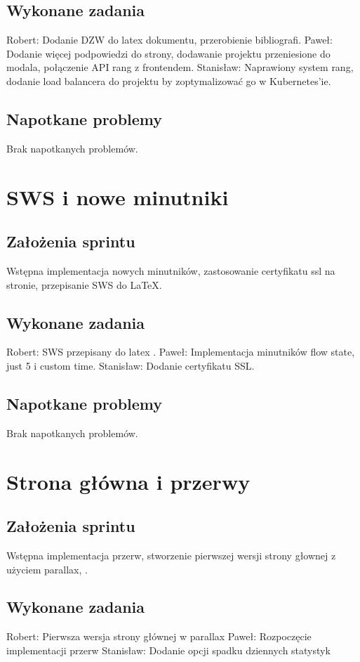 \documentclass[a4paper,11pt]{report}
\begin{document}
\subsection {Wykonane zadania}
Robert: Dodanie DZW do latex dokumentu, przerobienie bibliografi. 
Paweł: Dodanie więcej podpowiedzi do strony, dodawanie projektu przeniesione do modala, połączenie API rang z frontendem.
Stanisław: Naprawiony system rang, dodanie load balancera do projektu by zoptymalizować go w Kubernetes'ie.    
\subsection {Napotkane problemy}
Brak napotkanych problemów.

\section {SWS i nowe minutniki}
\subsection {Założenia sprintu}
Wstępna implementacja nowych minutników, zastosowanie certyfikatu ssl na stronie, przepisanie SWS do LaTeX.
\subsection {Wykonane zadania}
Robert: SWS przepisany do latex .
Paweł: Implementacja minutników flow state, just 5 i custom time.  
Stanisław: Dodanie certyfikatu SSL.  
\subsection {Napotkane problemy}
Brak napotkanych problemów.

\section {Strona główna i przerwy}
\subsection {Założenia sprintu}
Wstępna implementacja przerw, stworzenie pierwszej wersji strony głownej z użyciem parallax, .
\subsection {Wykonane zadania}
Robert: Pierwsza wersja strony głównej w parallax 
Paweł: Rozpoczęcie implementacji przerw 
Stanisław: Dodanie opcji spadku dziennych statystyk  
\end{document}
